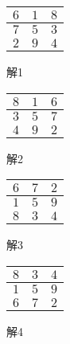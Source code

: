 \documentclass[11pt]{jsarticle}
\begin{document}
\begin{figure}[htbp]
  \captionsetup{labelformat=empty}
  \begin{minipage}{0.24\hsize}
    \centering
    \begin{tabular}{|c|c|c|}
      \hline
      $6$ & $1$ & $8$ \\ \hline
      $7$ & $5$ & $3$ \\ \hline
      $2$ & $9$ & $4$ \\ \hline
    \end{tabular}
    \caption{解1}
    \label{}
  \end{minipage}
  \begin{minipage}{0.24\hsize}
    \centering
    \begin{tabular}{|c|c|c|}
      \hline
      $8$ & $1$ & $6$ \\ \hline
      $3$ & $5$ & $7$ \\ \hline
      $4$ & $9$ & $2$ \\ \hline
    \end{tabular}
    \caption{解2}
    \label{}
  \end{minipage}
  \begin{minipage}{0.24\hsize}
    \centering
    \begin{tabular}{|c|c|c|}
      \hline
      $6$ & $7$ & $2$ \\ \hline
      $1$ & $5$ & $9$ \\ \hline
      $8$ & $3$ & $4$ \\ \hline
    \end{tabular}
    \caption{解3}
    \label{}
  \end{minipage}
  \begin{minipage}{0.24\hsize}
    \centering
    \begin{tabular}{|c|c|c|}
      \hline
      $8$ & $3$ & $4$ \\ \hline
      $1$ & $5$ & $9$ \\ \hline
      $6$ & $7$ & $2$ \\ \hline
    \end{tabular}
    \caption{解4}
  \end{minipage}
\end{figure}
\end{document}

